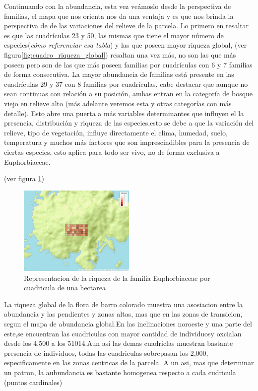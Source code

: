 \documentclass[11pt,]{article}
\begin{document}
Continuando con la abundancia, esta vez veámoslo desde la perspectiva de
familias, el mapa que nos orienta nos da una ventaja y es que nos brinda
la perspectiva de de las variaciones del relieve de la parcela. Lo
primero en resaltar es que las cuadrículas 23 y 50, las mismas que tiene
el mayor número de especies(\emph{cómo referenciar esa tabla}) y las que
poseen mayor riqueza global, (ver figura\ref{fig:cuadro_riqueza_global})
resaltan una vez más, no son las que más poseen pero son de las que más
poseen familias por cuadrículas con 6 y 7 familias de forma consecutiva.
La mayor abundancia de familias está presente en las cuadrículas 29 y 37
con 8 familias por cuadrículas, cabe destacar que aunque no sean
continuas con relación a su posición, ambas entran en la categoría de
bosque viejo en relieve alto (más adelante veremos esta y otras
categorías con más detalle). Esto abre una puerta a más variables
determinantes que influyen el la presencia, distribución y riqueza de
las especies,esto se debe a que la variación del relieve, tipo de
vegetación, influye directamente el clima, humedad, suelo, temperatura y
muchos más factores que son imprescindibles para la presencia de ciertas
especies, esto aplica para todo ser vivo, no de forma exclusiva a
Euphorbiaceae.

(ver figura \ref{fig:cuadro_de_riqueza_familia})

\begin{figure}
\centering
\includegraphics[width=0.50000\textwidth]{mapa_cuadros_riq_mi_familia.png}
\caption{\label{fig:cuadro_de_riqueza_familia}Representacion de la
riqueza de la familia Euphorbiaceae por cuadricula de una hectarea}
\end{figure}

La riqueza global de la flora de barro colorado muestra una asosiacion
entre la abundancia y las pendientes y zonas altas, mas que en las zonas
de transicion, segun el mapa de abundancia global.En las inclinaciones
noroeste y una parte del este,se encuentran las cuadriculas con mayor
cantidad de individuosy oxcialan desde los 4,500 a los 51014.Aun asi las
demas cuadriclas muestran bastante presencia de individuos, todas las
cuadriculas sobrepasan los 2,000, especificamente en las zonas centricas
de la parcela. A un asi, mas que determinar un patron, la aubundancia es
bastante homogenea respecto a cada cudricula (puntos cardinales)
\end{document}
